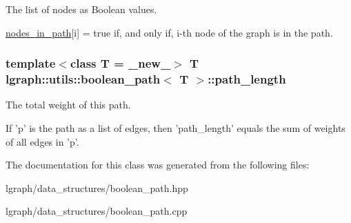 The list of nodes as Boolean values. 

\hyperlink{classlgraph_1_1utils_1_1boolean__path_ab94143c4100d65e2989fb150d6112818}{nodes\-\_\-in\-\_\-path}\mbox{[}i\mbox{]} = true if, and only if, i-\/th node of the graph is in the path. \hypertarget{classlgraph_1_1utils_1_1boolean__path_a35ff8125a2ef2418feb576d2fe528517}{
\subsubsection[{path\-\_\-length}]{\setlength{\rightskip}{0pt plus 5cm}template$<$class T = \-\_\-new\-\_\-$>$ T {\bf lgraph\-::utils\-::boolean\-\_\-path}$<$ T $>$\-::path\-\_\-length\hspace{0.3cm}{\ttfamily [private]}}}\label{classlgraph_1_1utils_1_1boolean__path_a35ff8125a2ef2418feb576d2fe528517}


The total weight of this path. 

If 'p' is the path as a list of edges, then 'path\-\_\-length' equals the sum of weights of all edges in 'p'. 

The documentation for this class was generated from the following files\-:\begin{DoxyCompactItemize}
\item 
lgraph/data\-\_\-structures/boolean\-\_\-path.\-hpp\item 
lgraph/data\-\_\-structures/boolean\-\_\-path.\-cpp\end{DoxyCompactItemize}
